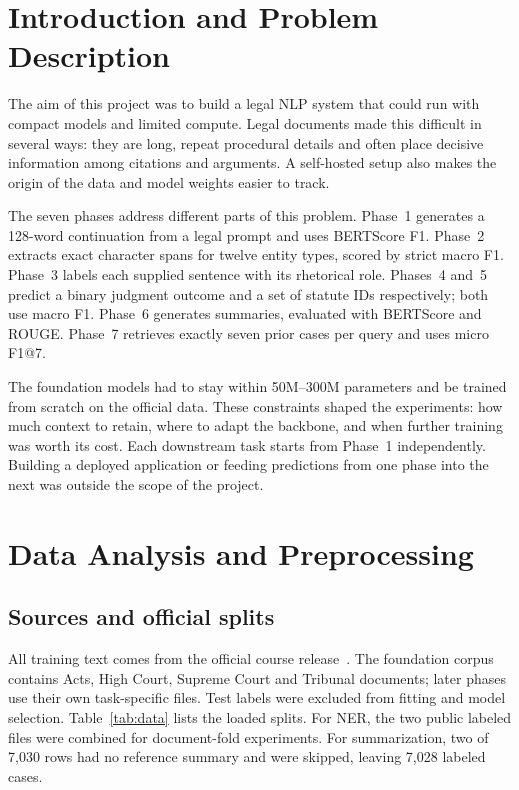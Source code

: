 \section{Introduction and Problem Description}
The aim of this project was to build a legal NLP system that could run with compact models and limited compute. Legal documents made this difficult in several ways: they are long, repeat procedural details and often place decisive information among citations and arguments. A self-hosted setup also makes the origin of the data and model weights easier to track.

The seven phases address different parts of this problem. Phase~1 generates a 128-word continuation from a legal prompt and uses BERTScore F1. Phase~2 extracts exact character spans for twelve entity types, scored by strict macro F1. Phase~3 labels each supplied sentence with its rhetorical role. Phases~4 and~5 predict a binary judgment outcome and a set of statute IDs respectively; both use macro F1. Phase~6 generates summaries, evaluated with BERTScore and ROUGE. Phase~7 retrieves exactly seven prior cases per query and uses micro F1@7.

The foundation models had to stay within 50M--300M parameters and be trained from scratch on the official data. These constraints shaped the experiments: how much context to retain, where to adapt the backbone, and when further training was worth its cost. Each downstream task starts from Phase~1 independently. Building a deployed application or feeding predictions from one phase into the next was outside the scope of the project.

\section{Data Analysis and Preprocessing}
\subsection{Sources and official splits}
All training text comes from the official course release~\cite{course}. The foundation corpus contains Acts, High Court, Supreme Court and Tribunal documents; later phases use their own task-specific files. Test labels were excluded from fitting and model selection. Table~\ref{tab:data} lists the loaded splits. For NER, the two public labeled files were combined for document-fold experiments. For summarization, two of 7,030 rows had no reference summary and were skipped, leaving 7,028 labeled cases.

